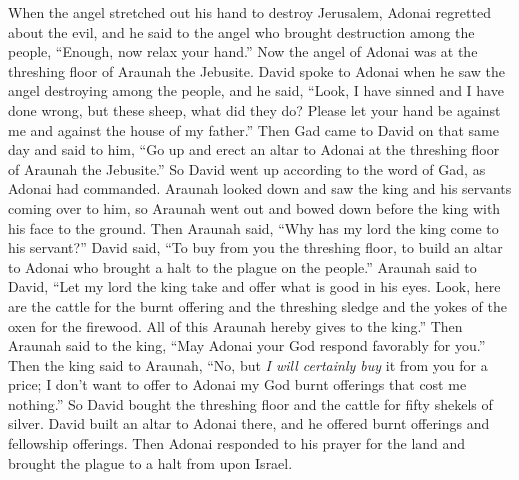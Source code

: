 \begin{biblechapter}
\verse When the angel stretched out his hand to destroy Jerusalem, Adonai regretted about the evil, and he said to the angel who brought destruction among the people, “Enough, now relax your hand.” Now the angel of Adonai was at the threshing floor of Araunah the Jebusite.
\verse David spoke to Adonai when he saw the angel destroying among the people, and he said, “Look, I have sinned and I have done wrong, but these sheep, what did they do? Please let your hand be against me and against the house of my father.”
\verse Then Gad came to David on that same day and said to him, “Go up and erect an altar to Adonai at the threshing floor of Araunah the Jebusite.”
\verse So David went up according to the word of Gad, as Adonai had commanded.
\verse Araunah looked down and saw the king and his servants coming over to him, so Araunah went out and bowed down before the king with his face to the ground.
\verse Then Araunah said, “Why has my lord the king come to his servant?” David said, “To buy from you the threshing floor, to build an altar to Adonai who brought a halt to the plague on the people.”
\verse Araunah said to David, “Let my lord the king take and offer what is good in his eyes. Look, here are the cattle for the burnt offering and the threshing sledge and the yokes of the oxen for the firewood.
\verse All of this Araunah hereby gives to the king.” Then Araunah said to the king, “May Adonai your God respond favorably for you.”
\verse Then the king said to Araunah, “No, but \textit{I will certainly buy} it from you for a price; I don’t want to offer to Adonai my God burnt offerings that cost me nothing.” So David bought the threshing floor and the cattle for fifty shekels of silver.
\verse David built an altar to Adonai there, and he offered burnt offerings and fellowship offerings. Then Adonai responded to his prayer for the land and brought the plague to a halt from upon Israel.
\end{biblechapter}

